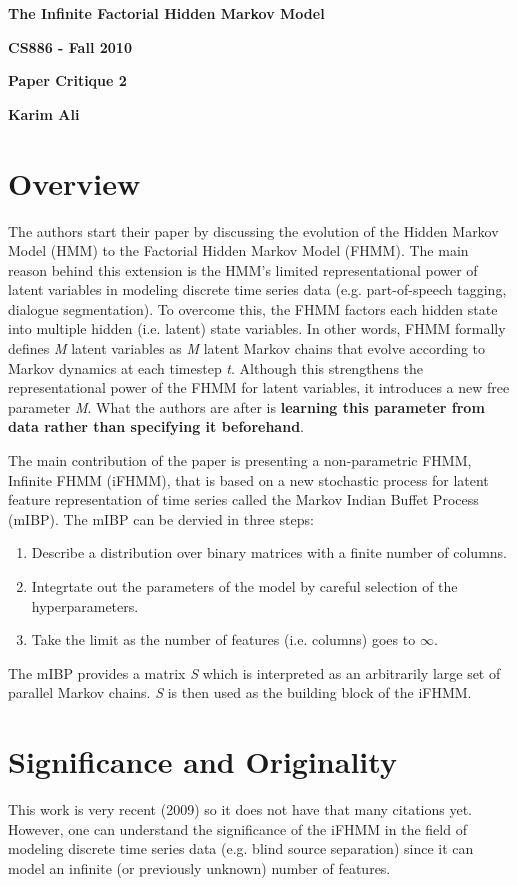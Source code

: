 \documentclass[10pt,a4paper]{article}
\begin{document}
\centerline{\sc \large \textbf{The Infinite Factorial Hidden Markov Model}}
\centerline{\textbf{CS886 - Fall 2010}}
\centerline{\textbf{Paper Critique 2}}
\centerline{\textbf{Karim Ali}}
\vspace{2pc}

\section{Overview}
The authors start their paper by discussing the evolution of the Hidden Markov Model (HMM) to the Factorial Hidden Markov Model (FHMM). The main reason
behind this extension is the HMM's limited representational power of latent variables in modeling discrete time series data (e.g. part-of-speech tagging,
dialogue segmentation). To overcome this, the FHMM factors each hidden state into multiple hidden (i.e. latent) state variables. In other words, FHMM formally
defines \textit{M} latent variables as \textit{M} latent Markov chains that evolve according to Markov dynamics at each timestep \textit{t}. Although this
strengthens the representational power of the FHMM for latent variables, it introduces a new free parameter \textit{M}. What the authors are after is
\textbf{learning this parameter from data rather than specifying it beforehand}.

The main contribution of the paper is presenting a non-parametric FHMM, Infinite FHMM (iFHMM), that is based on a new stochastic process for latent feature
representation of time series called the Markov Indian Buffet Process (mIBP). The mIBP can be dervied in three steps:

\begin{enumerate}
 \item Describe a distribution over binary matrices with a finite number of columns.
 \item Integrtate out the parameters of the model by careful selection of the hyperparameters.
 \item Take the limit as the number of features (i.e. columns) goes to $\infty$.
\end{enumerate}

The mIBP provides a matrix \textit{S} which is interpreted as an arbitrarily large set of parallel Markov chains. \textit{S} is then used as the building block
of the iFHMM.

\section{Significance and Originality}
This work is very recent (2009) so it does not have that many citations yet. However, one can understand the significance of the iFHMM in the field of modeling
discrete time series data (e.g. blind source separation) since it can model an infinite (or previously unknown) number of features.
\end{document}
